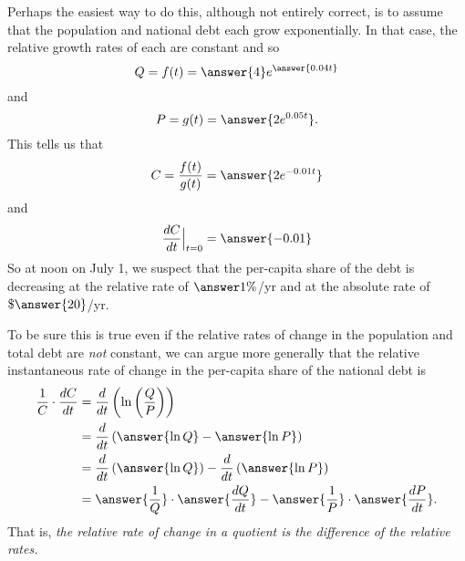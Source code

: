 \documentclass{ximera}
\begin{document}
\begin{question}
\begin{explanation}
Perhaps the easiest way to do this, although not entirely correct, is to assume that the population and national debt each grow exponentially. In that case, the relative growth rates of each are constant and so
\[
    Q = f(t) = \answer{4}e^{\answer{0.04t}}
\]
and 
\[
      P = g(t) = \answer{2e^{0.05t}} .
\]
This tells us that
\[
       C = \frac{f(t)}{g(t)} = \answer{2e^{-0.01t}}
\]
and
\[
        \frac{dC}{dt} \Big|_{t=0} = \answer{-0.01} 
\]
So at noon on July 1, we suspect that the per-capita share of the debt is decreasing at the relative rate of $\answer{1\%}$/yr
and at the absolute rate of $\$\answer{20}$/yr.

To be sure this is true even if the relative rates of change in the population and total debt are \emph{not} constant, we can argue more generally that the relative instantaneous rate of change in the per-capita share of the national debt is
\begin{align*}
        \frac{1}{C} \cdot \frac{dC}{dt} &= \frac{d}{dt}\left( \ln \left(\frac{Q}{P}\right)  \right) \\
                                                      &= \frac{d}{dt} \left(  \answer{\ln Q} - \answer{\ln P}     \right) \\
                                                      &= \frac{d}{dt} \left( \answer{\ln Q} \right) - \frac{d}{dt} \left(  \answer{\ln P} \right)  \\
                                                      &= \answer{\frac{1}{Q}} \cdot \answer{\frac{dQ}{dt}} - \answer{\frac{1}{P}} \cdot \answer{\frac{dP}{dt}} .
\end{align*}
That is, \emph{the relative rate of change in a quotient is the difference of the relative rates.}

\end{explanation}

\end{question}
\end{document}
